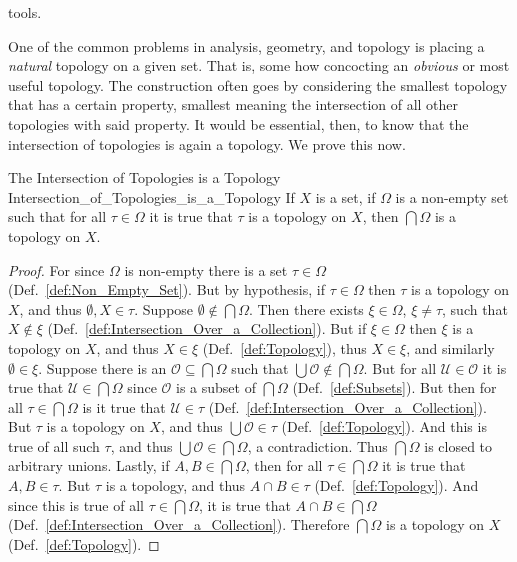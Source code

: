     tools.
    \par\hfill\par
    One of the common problems in analysis, geometry, and topology is placing a
    \textit{natural} topology on a given set. That is, some how concocting an
    \textit{obvious} or most useful topology. The construction often goes by
    considering the smallest topology that has a certain property, smallest
    meaning the intersection of all other topologies with said property. It
    would be essential, then, to know that the intersection of topologies is
    again a topology. We prove this now.
    \begin{ltheorem}{The Intersection of Topologies is a Topology}
                   {Intersection_of_Topologies_is_a_Topology}
        If $X$ is a set, if $\Omega$ is a non-empty set such that for all
        $\tau\in\Omega$ it is true that $\tau$ is a topology on $X$, then
        $\bigcap\Omega$ is a topology on $X$.
    \end{ltheorem}
    \begin{proof}
        For since $\Omega$ is non-empty there is a set $\tau\in\Omega$
        (Def.~\ref{def:Non_Empty_Set}). But by hypothesis, if $\tau\in\Omega$
        then $\tau$ is a topology on $X$, and thus $\emptyset,X\in\tau$.
        Suppose $\emptyset\notin\bigcap\Omega$. Then there exists
        $\xi\in\Omega$, $\xi\ne\tau$, such that $X\notin\xi$
        (Def.~\ref{def:Intersection_Over_a_Collection}). But if $\xi\in\Omega$
        then $\xi$ is a topology on $X$, and thus $X\in\xi$
        (Def.~\ref{def:Topology}), thus $X\in\xi$, and similarly
        $\emptyset\in\xi$. Suppose there is an
        $\mathcal{O}\subseteq\bigcap\Omega$ such that
        $\bigcup\mathcal{O}\notin\bigcap\Omega$. But for all
        $\mathcal{U}\in\mathcal{O}$ it is true that
        $\mathcal{U}\in\bigcap\Omega$ since $\mathcal{O}$ is a subset of
        $\bigcap\Omega$ (Def.~\ref{def:Subsets}). But then for all
        $\tau\in\bigcap\Omega$ is it true that $\mathcal{U}\in\tau$
        (Def.~\ref{def:Intersection_Over_a_Collection}). But $\tau$ is a
        topology on $X$, and thus $\bigcup\mathcal{O}\in\tau$
        (Def.~\ref{def:Topology}). And this is true of all such $\tau$, and thus
        $\bigcup\mathcal{O}\in\bigcap\Omega$, a contradiction. Thus
        $\bigcap\Omega$ is closed to arbitrary unions. Lastly, if
        $A,B\in\bigcap\Omega$, then for all $\tau\in\bigcap\Omega$ it is true
        that $A,B\in\tau$. But $\tau$ is a topology, and thus
        $A\cap{B}\in\tau$ (Def.~\ref{def:Topology}). And since this is true of
        all $\tau\in\bigcap\Omega$, it is true that $A\cap{B}\in\bigcap\Omega$
        (Def.~\ref{def:Intersection_Over_a_Collection}). Therefore
        $\bigcap\Omega$ is a topology on $X$ (Def.~\ref{def:Topology}).
    \end{proof}
